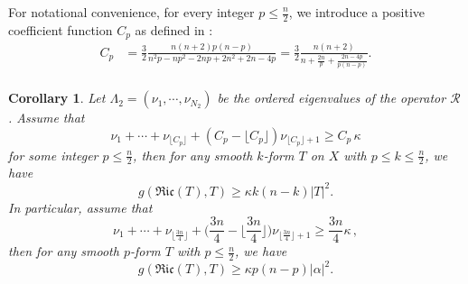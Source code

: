 \documentclass[12pt, twoside]{article}
\newtheorem{corollary}[theorem]{Corollary}
\theoremstyle{definition}
\numberwithin{equation}{section}
\def \a {\alpha }
\begin{document}
For notational convenience, for every integer $p\leq \frac{n}{2}$, we introduce a positive coefficient function $C_{p}$ as defined in \cite{PW21b}:
\begin{equation}\label{Cp}
\begin{split}
C_{p}&=\frac{3}{2}\frac{n(n+2)p(n-p)}{n^{2}p-np^{2}-2np+2n^{2}+2n-4p}=\frac{3}{2}\frac{n(n+2)}{n+\frac{2n}{p}+\frac{2n-4p}{p(n-p)}}.\\
\end{split}
\end{equation}



\begin{corollary}\label{C1}
Let $\Lambda_{2}=(\nu_{1},\cdots,\nu_{N_{2}})$  be the ordered eigenvalues of the operator  $\mathcal{R}$. Assume that 
\begin{equation}\label{C1 assume 1}
\nu_1 + \cdots + \nu_{\lfloor C_{p} \rfloor} + (C_{p} - \lfloor C_{p} \rfloor)\nu_{\lfloor C_{p} \rfloor+1} \geq C_{p}\,\kappa
\end{equation}
for some integer $p\leq \frac{n}{2}$,  then for any smooth $k$-form $T$ on $X$ with $p\leq k\leq \frac{n}{2}$, we have
\begin{equation*}
g(\mathfrak{Ric}(T), T) \geq \kappa k(n-k)|T|^2.
\end{equation*}
In particular,  assume that
\begin{equation}\label{C1 assume 2}
\nu_{1}+\cdots+\nu_{\lfloor\frac{3n}{4}\rfloor }+\Big(\frac{3n}{4}-\lfloor\frac{3n}{4}\rfloor\Big)\nu_{\lfloor\frac{3n}{4}\rfloor +1}\geq \frac{3n}{4}\kappa\,,
\end{equation}
then for any smooth $p$-form $T$ with $p\leq \frac{n}{2}$, we have  
\begin{equation*}
g(\mathfrak{Ric}(T),T)\geq\kappa p(n-p)|\a|^{2}.
\end{equation*}
\end{corollary}
\end{document}
